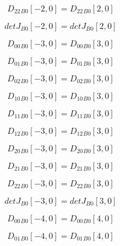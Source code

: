 \documentclass{article}
\begin{document}
\begin{dmath}{D_{22}{_{B0}}}[{-2,0}] = {D_{22}{_{B0}}}[{2,0}]\end{dmath}

\begin{dmath}{detJ{_{B0}}}[{-2,0}] = {detJ{_{B0}}}[{2,0}]\end{dmath}

\begin{dmath}{D_{00}{_{B0}}}[{-3,0}] = {D_{00}{_{B0}}}[{3,0}]\end{dmath}

\begin{dmath}{D_{01}{_{B0}}}[{-3,0}] = {D_{01}{_{B0}}}[{3,0}]\end{dmath}

\begin{dmath}{D_{02}{_{B0}}}[{-3,0}] = {D_{02}{_{B0}}}[{3,0}]\end{dmath}

\begin{dmath}{D_{10}{_{B0}}}[{-3,0}] = {D_{10}{_{B0}}}[{3,0}]\end{dmath}

\begin{dmath}{D_{11}{_{B0}}}[{-3,0}] = {D_{11}{_{B0}}}[{3,0}]\end{dmath}

\begin{dmath}{D_{12}{_{B0}}}[{-3,0}] = {D_{12}{_{B0}}}[{3,0}]\end{dmath}

\begin{dmath}{D_{20}{_{B0}}}[{-3,0}] = {D_{20}{_{B0}}}[{3,0}]\end{dmath}

\begin{dmath}{D_{21}{_{B0}}}[{-3,0}] = {D_{21}{_{B0}}}[{3,0}]\end{dmath}

\begin{dmath}{D_{22}{_{B0}}}[{-3,0}] = {D_{22}{_{B0}}}[{3,0}]\end{dmath}

\begin{dmath}{detJ{_{B0}}}[{-3,0}] = {detJ{_{B0}}}[{3,0}]\end{dmath}

\begin{dmath}{D_{00}{_{B0}}}[{-4,0}] = {D_{00}{_{B0}}}[{4,0}]\end{dmath}

\begin{dmath}{D_{01}{_{B0}}}[{-4,0}] = {D_{01}{_{B0}}}[{4,0}]\end{dmath}
\end{document}
